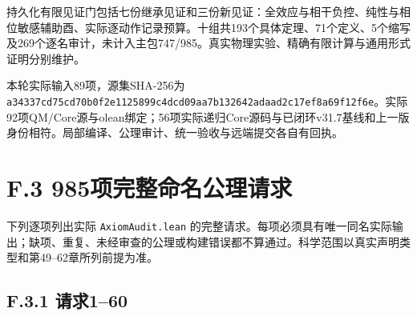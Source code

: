 \documentclass[
  11pt,
  oneside]{book}
\begin{document}
持久化有限见证门包括七份继承见证和三份新见证：全效应与相干负控、纯性与相位敏感辅助酉、实际逐动作记录预算。十组共193个具体定理、71个定义、5个缩写及269个逐名审计，未计入主包747/985。真实物理实验、精确有限计算与通用形式证明分别维护。

本轮实际输入89项，源集SHA-256为
\texttt{a34337cd75cd70b0\allowbreak f2e1125899c4dcd0\allowbreak 9aa7b132642adaad\allowbreak 2c17ef8a69f12f6e}。实际92项QM/Core源与olean绑定；56项实际递归Core源码与已闭环v31.7基线和上一版身份相符。局部编译、公理审计、统一验收与远端提交各自有回执。

\hypertarget{f.3-985ux9879ux5b8cux6574ux547dux540dux516cux7406ux8bf7ux6c42}{%
\section{F.3
985项完整命名公理请求}\label{f.3-985ux9879ux5b8cux6574ux547dux540dux516cux7406ux8bf7ux6c42}}

下列逐项列出实际 \texttt{AxiomAudit.lean}
的完整请求。每项必须具有唯一同名实际输出；缺项、重复、未经审查的公理或构建错误都不算通过。科学范围以真实声明类型和第49--62章所列前提为准。

\hypertarget{f.3.1-ux8bf7ux6c42160}{%
\subsection{F.3.1 请求1--60}\label{f.3.1-ux8bf7ux6c42160}}
\end{document}
